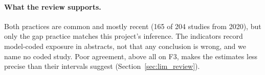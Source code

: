 \paragraph{What the review supports.} Both practices are common and mostly recent (165 of 204 studies from 2020), but only the gap practice matches this project's inference. The indicators record model-coded exposure in abstracts, not that any conclusion is wrong, and we name no coded study. Poor agreement, above all on F3, makes the estimates less precise than their intervals suggest (Section~\ref{sec:lim_review}).
